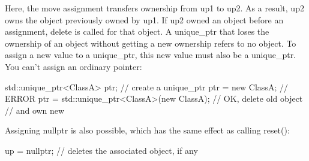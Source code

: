 \documentclass{report}
\begin{document}
\bigbreak \noindent 
Here, the move assignment transfers ownership from up1 to up2. As a result, up2 owns the object previously owned by up1.
\bigbreak \noindent 
If up2 owned an object before an assignment, delete is called for that object. A unique\_ptr that loses the ownership of an object without getting a new ownership refers to no object.
\bigbreak \noindent 
To assign a new value to a unique\_ptr, this new value must also be a unique\_ptr. You can’t assign an ordinary pointer:
\bigbreak \noindent 
\begin{cppcode}
    std::unique_ptr<ClassA> ptr; // create a unique_ptr
    ptr = new ClassA; // ERROR
    ptr = std::unique_ptr<ClassA>(new ClassA); // OK, delete old object
    // and own new
\end{cppcode}
\bigbreak \noindent 
Assigning nullptr is also possible, which has the same effect as calling reset():
\bigbreak \noindent 
\begin{cppcode}
up = nullptr; // deletes the associated object, if any
\end{cppcode}

\bigbreak \noindent 
\end{document}
